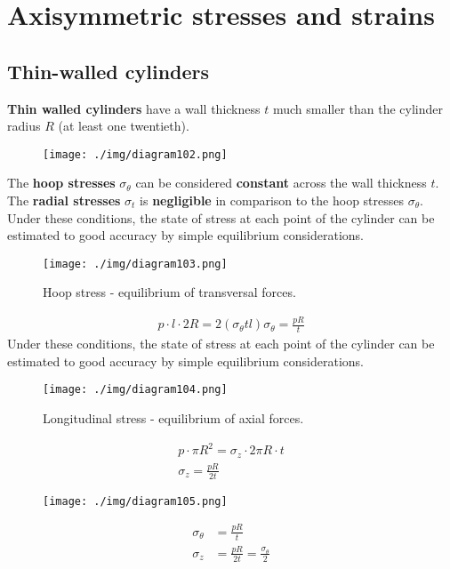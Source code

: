 \chapter{Axisymmetric stresses and strains}
\section{Thin-walled cylinders}
\textbf{Thin walled cylinders} have a wall thickness $t$ much smaller than the cylinder radius $R$ (at least one twentieth).
\begin{figure}[H]
  \centering
  \texttt{[image: ./img/diagram102.png]}
  \caption{}
\end{figure}
The \textbf{hoop stresses} $\sigma_{\theta}$ can be considered \textbf{constant} across the wall thickness $t$. The \textbf{radial stresses} $\sigma_t$ is \textbf{negligible} in comparison to the hoop stresses $\sigma_{\theta}$. Under these conditions, the state of stress at each point of the cylinder can be estimated to good accuracy by simple equilibrium considerations.
\begin{figure}[H]
  \centering
  \texttt{[image: ./img/diagram103.png]}
  \caption{Hoop stress - equilibrium of transversal forces.}
\end{figure}
\begin{gather}
  p\cdot l \cdot 2R = 2 \left(\sigma_{\theta} t l\right)
  \sigma_{\theta} = \frac{p R}{t}
\end{gather}
Under these conditions, the state of stress at each point of the cylinder can be estimated to good accuracy by simple equilibrium considerations.
\begin{figure}[H]
  \centering
  \texttt{[image: ./img/diagram104.png]}
  \caption{Longitudinal stress - equilibrium of axial forces.}
\end{figure}
\begin{gather}
  p \cdot \pi R^2 = \sigma_z \cdot 2 \pi R \cdot t\\
  \sigma_z = \frac{pR}{2t}
\end{gather}
\begin{figure}[H]
  \centering
  \texttt{[image: ./img/diagram105.png]}
  \caption{}
\end{figure}
\begin{align}
  \sigma_{\theta} & = \frac{pR}{t}                              \\
  \sigma_z        & = \frac{pR}{2t} = \frac{\sigma_{\theta}}{2}
\end{align}
